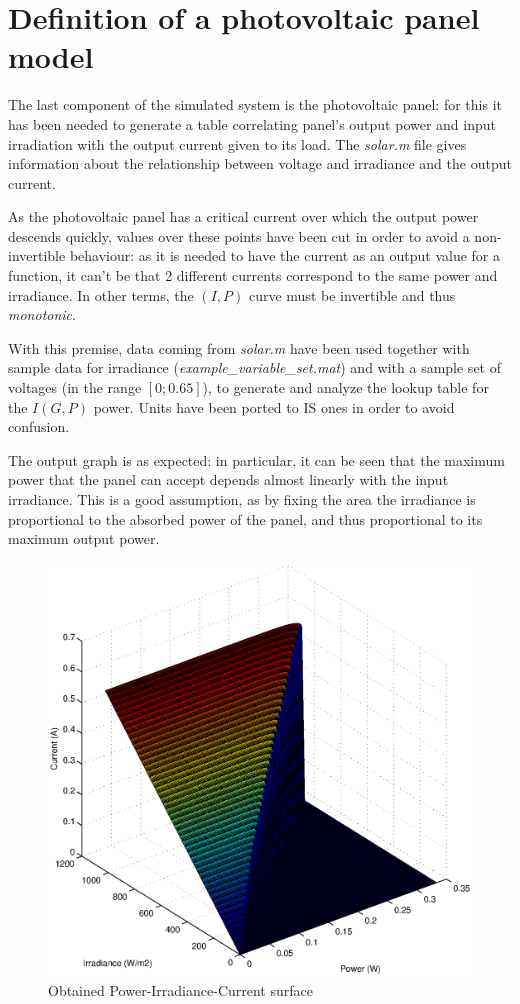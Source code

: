 \section{Definition of a photovoltaic panel model}
The last component of the simulated system is the photovoltaic panel: for this it has been needed to generate a table correlating panel's output power and input irradiation with the output current given to its load. The \emph{solar.m} file gives information about the relationship between voltage and irradiance and the output current. 

As the photovoltaic panel has a critical current over which the output power descends quickly, values over these points have been cut in order to avoid a non-invertible behaviour: as it is needed to have the current as an output value for a function, it can't be that 2 different currents correspond to the same power and irradiance. In other terms, the $(I,P)$ curve must be invertible and thus \emph{monotonic}.

With this premise, data coming from \emph{solar.m} have been used together with sample data for irradiance (\emph{example\_variable\_set.mat}) and with a sample set of voltages (in the range $[0;0.65]$), to generate and analyze the lookup table for the $I(G,P)$ power. Units have been ported to IS ones in order to avoid confusion.

The output graph is as expected: in particular, it can be seen that the maximum power that the panel can accept depends almost linearly with the input irradiance. This is a good assumption, as by fixing the area the irradiance is proportional to the absorbed power of the panel, and thus proportional to its maximum output power.

\begin{figure}[h]
  \centering
  \includegraphics[width=5in]{power_irradiance_current}
  \caption{Obtained Power-Irradiance-Current surface}
\end{figure}
